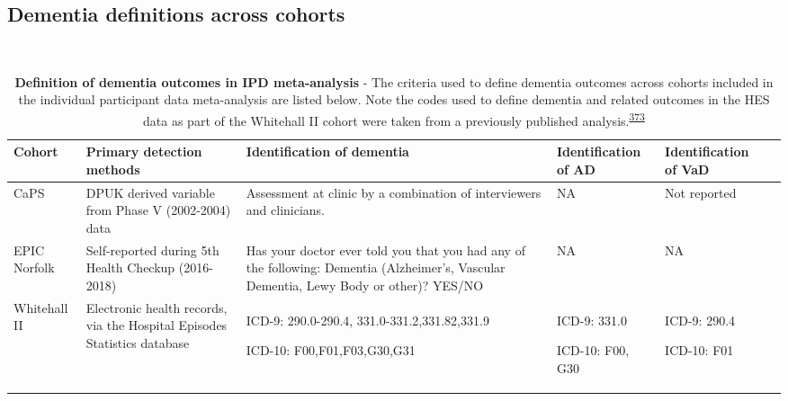 \documentclass[a4paper, twoside]{templates/ociamthesis}
\begin{document}
\newpage

\hypertarget{appendix-ipd-dementia-def}{%
\subsection{Dementia definitions across cohorts}\label{appendix-ipd-dementia-def}}

~





\begin{table}[H]

\caption[Definition of dementia outcomes in IPD meta-analysis]{\label{tab:ipdDementiaDef-table}\textbf{Definition of dementia outcomes in IPD meta-analysis} - The criteria used to define dementia outcomes across cohorts included in the individual participant data meta-analysis are listed below. Note the codes used to define dementia and related outcomes in the HES data as part of the Whitehall II cohort were taken from a previously published analysis.\textsuperscript{\protect\hyperlink{ref-russ2014}{373}}}
\centering
\begin{tabular}[t]{>{\raggedright\arraybackslash}p{4em}>{\raggedright\arraybackslash}p{6.9em}>{\raggedright\arraybackslash}p{6.9em}>{\raggedright\arraybackslash}p{6.9em}>{\raggedright\arraybackslash}p{6.9em}>{}p{6.9em}}
\toprule
\textbf{Cohort} & \textbf{Primary detection methods} & \textbf{Identification of dementia} & \textbf{Identification of AD} & \textbf{Identification of VaD}\\
\midrule
CaPS & DPUK derived variable from Phase V (2002-2004) data & Assessment at clinic by a combination of interviewers and clinicians. & NA & Not reported\\
\midrule
EPIC Norfolk & Self-reported during 5th Health Checkup (2016-2018) & Has your doctor ever told you that you had any of the following: Dementia (Alzheimer's, Vascular Dementia, Lewy Body or other)? YES/NO & NA & NA\\
\midrule
Whitehall II & Electronic health records, via the Hospital Episodes Statistics database & ICD-9: 290.0-290.4, 331.0-331.2,331.82,331.9

ICD-10: F00,F01,F03,G30,G31 & ICD-9: 331.0

ICD-10: F00, G30 & ICD-9: 290.4

ICD-10: F01\\
\bottomrule
\end{tabular}
\end{table}
\end{document}
